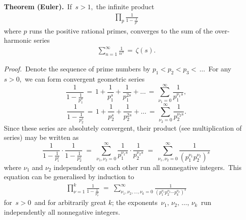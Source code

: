 \documentclass[12pt]{article}
\theoremstyle{definition}
\begin{document}

\textbf{Theorem (Euler).}\, If\, $s > 1$,\, the infinite product
\begin{align}
\prod_{p}\frac{1}{1-\frac{1}{p^s}}
\end{align}
where $p$ runs the positive rational primes, converges to the sum of the over-harmonic series
\begin{align}
\sum_{n=1}^\infty\frac{1}{n^s} \,=\, \zeta(s).
\end{align}


{\em Proof.}\, Denote the sequence of prime numbers by $p_1 < p_2 < p_3 <\,\ldots$\, For any\, $s > 0$,\, we can form convergent geometric series
$$\frac{1}{1-\frac{1}{p_1^s}} \,=\, 1+\frac{1}{p_1^s}+\frac{1}{p_1^{2s}}+\ldots 
\,=\, \sum_{\nu_1=0}^\infty\frac{1}{p_1^{\nu_1s}},$$
$$\frac{1}{1-\frac{1}{p_2^s}} \,=\, 1+\frac{1}{p_2^s}+\frac{1}{p_2^{2s}}+\ldots
\,=\, \sum_{\nu_2=0}^\infty\frac{1}{p_2^{\nu_2s}}.$$
Since these series are absolutely convergent, their product (see multiplication of series) may be written as
$$\frac{1}{1-\frac{1}{p_1^s}}\cdot\frac{1}{1-\frac{1}{p_2^s}} 
\;=\; \sum_{\nu_1,\nu_2=0}^\infty\frac{1}{p_1^{\nu_1s}}\cdot\frac{1}{p_2^{\nu_2s}} 
\;=\; \sum_{\nu_1,\nu_2=0}^\infty\frac{1}{\left(p_1^{\nu_1}p_2^{\nu_2}\right)^s}$$
where $\nu_1$ and $\nu_2$ independently on each other run all nonnegative integers.\, This equation can be generalised by induction to
\begin{align}
\prod_{\nu=1}^k \frac{1}{1-\frac{1}{p_\nu^s}} \;=\; 
\sum_{\nu_1,\nu_2,\ldots,\nu_k=0}^\infty\frac{1}{\left(p_1^{\nu_1}p_2^{\nu_2}\cdots p_k^{\nu_k}\right)^s}
\end{align}
for\, $s > 0$\, and for arbitrarily great $k$; the exponents \,$\nu_1,\,\nu_2,\,\ldots,\,\nu_k$\, run independently all nonnegative integers.
\end{document}

